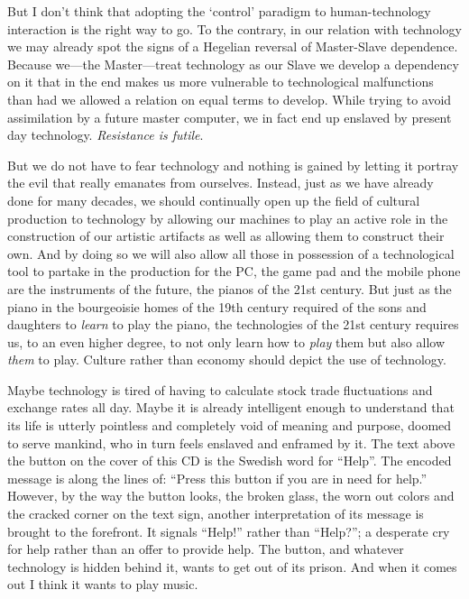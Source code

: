 
But I don't think that adopting the `control' paradigm to
human-technology interaction is the right way to go. To the contrary,
in our relation with technology we may already spot the signs of a
Hegelian reversal of Master-Slave dependence. Because we---the
Master---treat technology as our Slave we develop a dependency on it
that in the end makes us more vulnerable to technological malfunctions
than had we allowed a relation on equal terms to develop. While trying to
avoid assimilation by a future master computer, we in fact end
up enslaved by present day technology. \emph{Resistance is futile}.



But we do not have to fear technology and nothing is gained by letting
it portray the evil that really emanates from ourselves. Instead, just
as we have already done for many decades, we should continually open
up the field of cultural production to technology by allowing our
machines to play an active role in the construction of our artistic
artifacts as well as allowing them to construct their own. And by
doing so we will also allow all those in possession of a technological
tool to partake in the production for the PC, the game pad and the
mobile phone are the instruments of the future, the pianos of the 21st
century. But just as the piano in the bourgeoisie homes of the 19th
century required of the sons and daughters to \emph{learn} to play the
piano, the technologies of the 21st century requires us, to an even
higher degree, to not only learn how to \emph{play} them but also
allow \emph{them} to play. Culture rather than
economy should depict the use of technology.

Maybe technology is tired of having to calculate stock trade
fluctuations and exchange rates all day. Maybe it is already
intelligent enough to understand that its life is utterly pointless and
completely void of meaning and purpose, doomed to serve mankind, who in
turn feels enslaved and enframed by it. The text above the button on
the cover of this CD is the Swedish word for ``Help''. The encoded
message is along the lines of: ``Press this button if you are in need for help.''
However, by the way the button looks, the broken glass, the worn out
colors and the cracked corner on the text sign, another interpretation
of its message is brought to the forefront. It signals ``Help!''
rather than ``Help?''; a desperate cry for help rather than an offer
to provide help. The button, and whatever technology is hidden behind
it, wants to get out of its prison. And when it comes out I think it wants to
play music.



